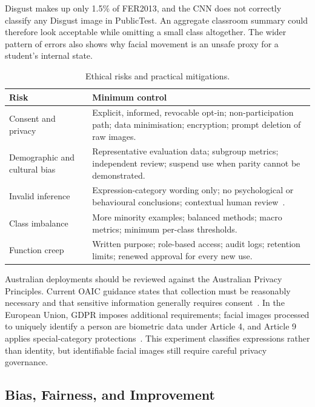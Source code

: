 \documentclass[10pt,twocolumn]{article}
\begin{document}
Disgust makes up only 1.5\% of FER2013, and the CNN does not correctly classify any Disgust image in PublicTest. An aggregate classroom summary could therefore look acceptable while omitting a small class altogether. The wider pattern of errors also shows why facial movement is an unsafe proxy for a student's internal state.

\begin{table}[!htbp]
\centering
\caption{Ethical risks and practical mitigations.}
\label{tab:ethics}
\footnotesize
\begin{tabularx}{\columnwidth}{>{\raggedright\arraybackslash}p{1.82cm}Y}
\toprule
Risk & Minimum control \\
\midrule
Consent and privacy & Explicit, informed, revocable opt-in; non-participation path; data minimisation; encryption; prompt deletion of raw images. \\
Demographic and cultural bias & Representative evaluation data; subgroup metrics; independent review; suspend use when parity cannot be demonstrated. \\
Invalid inference & Expression-category wording only; no psychological or behavioural conclusions; contextual human review~\cite{barrett2019}. \\
Class imbalance & More minority examples; balanced methods; macro metrics; minimum per-class thresholds. \\
Function creep & Written purpose; role-based access; audit logs; retention limits; renewed approval for every new use. \\
\bottomrule
\end{tabularx}
\end{table}

Australian deployments should be reviewed against the Australian Privacy Principles. Current OAIC guidance states that collection must be reasonably necessary and that sensitive information generally requires consent~\cite{oaic2026}. In the European Union, GDPR imposes additional requirements; facial images processed to uniquely identify a person are biometric data under Article 4, and Article 9 applies special-category protections~\cite{gdpr2016}. This experiment classifies expressions rather than identity, but identifiable facial images still require careful privacy governance.

\subsection{Bias, Fairness, and Improvement}
\end{document}
